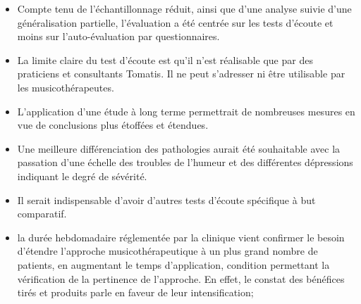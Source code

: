 \begin{itemize}
\item Compte tenu  de l'échantillonnage réduit, ainsi que d'une analyse
suivie d'une généralisation partielle, l'évaluation a été centrée sur les
tests d'écoute et moins sur
l'auto-évaluation par questionnaires.
\item La limite claire du test d'écoute est qu'il n'est réalisable que par des praticiens et consultants 
Tomatis.
Il ne peut s'adresser ni être utilisable par les musicothérapeutes.



\item  L'application d'une étude à long terme permettrait  de nombreuses
  mesures en vue de conclusions plus étoffées et étendues.

   \item  Une meilleure différenciation des pathologies aurait été souhaitable avec la 
   passation d'une échelle des troubles de l'humeur et des différentes
       dépressions indiquant le degré de sévérité.
     \item Il serait indispensable d'avoir  d'autres tests d'écoute spécifique à but
       comparatif.






     \item la durée hebdomadaire réglementée par la clinique vient
       confirmer le besoin d'étendre l'approche musicothérapeutique à
       un plus grand nombre de patients, en augmentant le temps
       d'application, condition permettant la vérification de la
       pertinence de l'approche. En effet, le constat des bénéfices
       tirés et
       produits parle en faveur de leur intensification;




\end{itemize}
